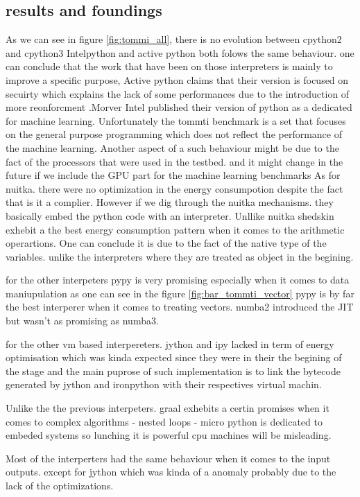 \subsection{results and foundings}
As we can see in figure \ref{fig:tommi_all}, there is no evolution between cpython2 and cpython3
Intelpython and active python both folows the same behaviour. one can conclude that the work that have been on those interpreters is mainly
to improve a specific purpose, Active python claims that their version is focused on secuirty which explains the lack of some performances due to the introduction of more reonforcment
.Morver Intel published their version of python as a dedicated for machine learning. Unfortunately the tommti benchmark is a set that focuses on the general purpose programming
which does not reflect the performance of the machine learning.
Another aspect of a such behaviour might be due to the fact of the processors that were used in the testbed. and it might change in the future if we include the GPU part for the machine learning benchmarks
As for nuitka. there were no optimization in the energy consumpotion despite the fact that is it a complier.
However if we dig through the nuitka mechanisms. they basically embed the python code with an interpreter.
Unllike nuitka shedskin exhebit a the best energy consumption pattern when it comes to the arithmetic operartions. One can conclude it is due to the fact of the native type of the variables. unlike the interpreters where they are treated as object in the begining.

for the other interpeters pypy is very promising especially when it comes to data maniupulation as one can see in the figure \ref{fig:bar_tommti_vector}
pypy is by far the best interperer when it comes to treating vectors.
numba2 introduced the JIT but wasn't as promising as numba3.

for the other vm based interpereters. jython and ipy lacked in term of energy optimisation which was kinda expected since they were in their the begining of the stage and the main puprose of such implementation is to link the bytecode generated by jython and ironpython with their respectives virtual machin.

Unlike the the previous interpeters. graal exhebits a certin promises when it comes to complex algorithms - nested loops -
micro python is dedicated to embeded systems so lunching it is powerful cpu machines will be misleading.

Most of the interperters had the same behaviour when it comes to the input outputs. except for jython which was kinda of a anomaly probably due to the lack of the optimizations.


